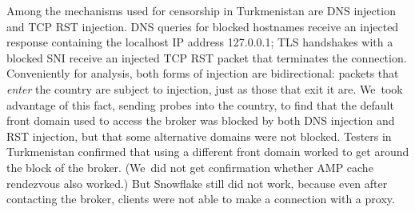 \documentclass[letterpaper,twocolumn]{article}
\begin{document}
Among the mechanisms used for censorship in Turkmenistan
are DNS injection and TCP RST injection.
DNS queries for blocked hostnames receive an injected response
containing the localhost IP address 127.0.0.1;
TLS handshakes with a blocked SNI receive an injected TCP RST packet
that terminates the connection.
Conveniently for analysis,
both forms of injection are bidirectional:
packets that \emph{enter} the country are subject to injection,
just as those that exit it are.
We~took advantage of this fact,
sending probes into the country,
to find that the default front domain used to access the broker
was blocked by both DNS injection and RST injection,
but that some alternative domains were not blocked.
Testers in Turkmenistan confirmed that using a different front domain
worked to get around the block of the broker.
(We~did not get confirmation whether AMP cache rendezvous also worked.)
But Snowflake still did not work,
because even after contacting the broker,
clients were not able to make a connection with a proxy.
\end{document}
